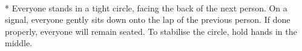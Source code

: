 \begin{minipage}{\textwidth}
\\*
Everyone stands in a tight circle, facing the back of the next person.  On a signal, everyone gently sits down onto the lap of the previous person.  If done properly, everyone will remain seated.  To stabilise the circle, hold hands in the middle.
\end{minipage}    \vfill
